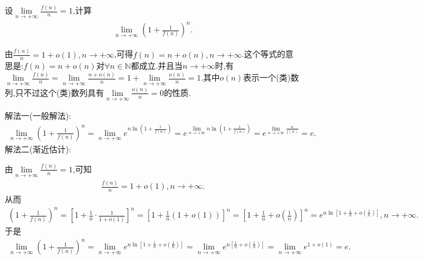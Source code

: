 \documentclass[../../main.tex]{subfiles}%
\begin{document}
\begin{example}
设$\underset{n\rightarrow +\infty}{\lim}\frac{f\left( n \right)}{n}=1$,计算
\begin{align*}
\underset{n\rightarrow +\infty}{\lim}\left( 1+\frac{1}{f\left( n \right)} \right) ^n.
\end{align*}
\end{example}
\begin{note}
由$\frac{f\left( n \right)}{n}=1+o\left( 1 \right) ,n\rightarrow +\infty$,可得$f\left( n \right) =n+o\left( n \right) ,n\rightarrow +\infty$.这个等式的意思是:$f(n)=n+o(n)$对$\forall n\in \mathbb{N}$都成立.并且当$n\to +\infty$时,有$\underset{n\rightarrow +\infty}{\lim}\frac{f\left( n \right)}{n}=\underset{n\rightarrow +\infty}{\lim}\frac{n+o\left( n \right)}{n}=1+\underset{n\rightarrow +\infty}{\lim}\frac{o\left( n \right)}{n}=1
$.其中$o(n)$表示一个(类)数列,只不过这个(类)数列具有$\underset{n\rightarrow +\infty}{\lim}\frac{o\left( n \right)}{n}=0$的性质.
\end{note}
\begin{solution}

{\color{blue}解法一(一般解法):}
\begin{align*}
\underset{n\rightarrow +\infty}{\lim}\left( 1+\frac{1}{f\left( n \right)} \right) ^n=\underset{n\rightarrow +\infty}{\lim}e^{n\ln \left( 1+\frac{1}{f\left( n \right)} \right)}=e^{\underset{n\rightarrow +\infty}{\lim}n\ln \left( 1+\frac{1}{f\left( n \right)} \right)}=e^{\underset{n\rightarrow +\infty}{\lim}\frac{n}{f\left( n \right)}}=e.
\end{align*}
{\color{blue}解法二(渐近估计):}

由$\underset{n\rightarrow +\infty}{\lim}\frac{f\left( n \right)}{n}=1$,可知
\begin{align*}
\frac{f\left( n \right)}{n}=1+o\left( 1 \right) ,n\rightarrow +\infty .
\end{align*}
从而
\begin{align*}
\left( 1+\frac{1}{f\left( n \right)} \right) ^n=\left[ 1+\frac{1}{n}\cdot \frac{1}{1+o\left( 1 \right)} \right] ^n=\left[ 1+\frac{1}{n}\left( 1+o\left( 1 \right) \right) \right] ^n=\left[ 1+\frac{1}{n}+o\left( \frac{1}{n} \right) \right] ^n=e^{n\ln \left[ 1+\frac{1}{n}+o\left( \frac{1}{n} \right) \right]},n\to +\infty.
\end{align*}
于是
\begin{align*}
\underset{n\rightarrow +\infty}{\lim}\left( 1+\frac{1}{f\left( n \right)} \right) ^n=\underset{n\rightarrow +\infty}{\lim}e^{n\ln \left[ 1+\frac{1}{n}+o\left( \frac{1}{n} \right) \right]}=\underset{n\rightarrow +\infty}{\lim}e^{n\left[ \frac{1}{n}+o\left( \frac{1}{n} \right) \right]}=\underset{n\rightarrow +\infty}{\lim}e^{1+o\left( 1 \right)}=e.
\end{align*}

\end{solution}
\end{document}

